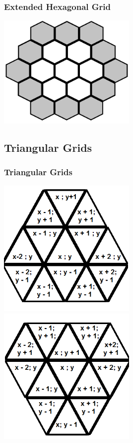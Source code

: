 \documentclass{beamer}
\begin{document}
\begin{frame}
\frametitle{Extended Hexagonal Grid}
\centering
\includegraphics[width=0.5\textwidth]{imgs/extendedhexagonal.png}
\end{frame}

\subsection{Triangular Grids} 
\begin{frame}
\frametitle{Triangular Grids}
\includegraphics[width=0.5\textwidth]{imgs/triangle1.png}
\includegraphics[width=0.5\textwidth]{imgs/triangle2.png}
\end{frame}
\end{document}

